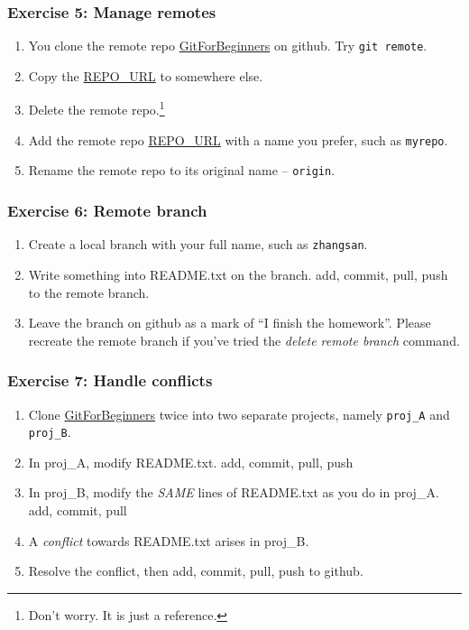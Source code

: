 \documentclass[11pt,ignorenonframetext,]{beamer}
\begin{document}
\begin{frame}[fragile]\frametitle{Exercise 5: Manage remotes}

\begin{enumerate}[1.]
\item
  You clone the remote repo
  \href{https://github.com/weijianwen/GitForBeginners}{GitForBeginners}
  on github. Try \texttt{git remote}.
\item
  Copy the
  \href{git@github.com:weijianwen/GitForBeginners.git}{REPO\_URL} to
  somewhere else.
\item
  Delete the remote repo.\footnote{Don't worry. It is just a reference.}
\item
  Add the remote repo
  \href{git@github.com:weijianwen/GitForBeginners.git}{REPO\_URL} with a
  name you prefer, such as \texttt{myrepo}.
\item
  Rename the remote repo to its original name -- \texttt{origin}.
\end{enumerate}
\end{frame}

\begin{frame}[fragile]\frametitle{Exercise 6: Remote branch}

\begin{enumerate}[1.]
\item
  Create a local branch with your full name, such as \texttt{zhangsan}.
\item
  Write something into README.txt on the branch. add, commit, pull, push
  to the remote branch.
\item
  Leave the branch on github as a mark of ``I finish the homework''.
  Please recreate the remote branch if you've tried the \emph{delete
  remote branch} command.
\end{enumerate}
\end{frame}

\begin{frame}[fragile]\frametitle{Exercise 7: Handle conflicts}

\begin{enumerate}[1.]
\item
  Clone
  \href{https://github.com/weijianwen/GitForBeginners}{GitForBeginners}
  twice into two separate projects, namely \texttt{proj\_A} and
  \texttt{proj\_B}.
\item
  In proj\_A, modify README.txt. add, commit, pull, push
\item
  In proj\_B, modify the \emph{SAME} lines of README.txt as you do in
  proj\_A. add, commit, pull
\item
  A \emph{conflict} towards README.txt arises in proj\_B.
\item
  Resolve the conflict, then add, commit, pull, push to github.
\end{enumerate}
\end{frame}
\end{document}
